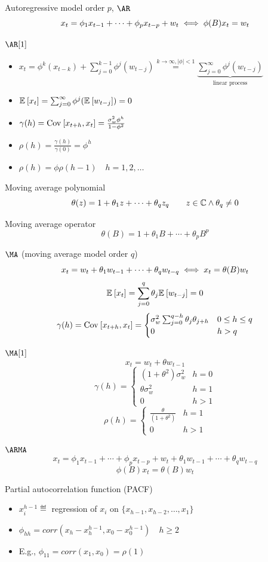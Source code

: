 \documentclass[landscape]{article}
\begin{document}
\begin{multicols*}{2}
Autoregressive model order $p$, $\AR$
$$x_t = \phi_1 x_{t-1} + \cdots + \phi_p x_{t-p} + w_t \;\Longleftrightarrow\; \phi(B)x_t = w_t$$

$\AR[1]$
\begin{itemize}
  \item $x_t = \phi^k(x_{t-k}) + \displaystyle\sum_{j=0}^{k-1} \phi^j(w_{t-j}) 
    \stackrel{k\to\infty, |\phi| < 1}{=} 
    \underbrace{\sum_{j=0}^\infty \phi^j(w_{t-j})}_{\text{linear process}}$
\item $\mathbb{E}_{}\left[x_t\right] = \sum_{j=0}^\infty\phi^j(\mathbb{E}_{}\left[w_{t-j}\right]) = 0$
\item $\gamma(h) = \mathrm{Cov}_{}\left[x_{t+h},x_t\right] = \frac{\sigma_w^2\phi^h}{1-\phi^2}$
\item $\rho(h) = \frac{\gamma(h)}{\gamma(0)} = \phi^h$
\item $\rho(h) = \phi \rho(h-1) \quad h=1,2,\ldots$
\end{itemize}

Moving average polynomial
$$\theta(z) = 1 + \theta_1 z + \cdots + \theta_q z_q 
\qquad z \in \mathbb{C} \wedge \theta_q \neq 0$$

Moving average operator
$$\theta(B) = 1 + \theta_1B + \cdots + \theta_pB^p$$

$\MA$ (moving average model order $q$)
$$x_t = w_t + \theta_1 w_{t-1} + \cdots + \theta_q w_{t-q} 
\;\Longleftrightarrow\; x_t = \theta(B)w_t$$
$$\mathbb{E}_{}\left[x_t\right] = \sum_{j=0}^q \theta_j\mathbb{E}_{}\left[w_{t-j}\right] = 0$$
$$\gamma(h) = \mathrm{Cov}_{}\left[x_{t+h},x_t\right] = \begin{cases}
  \sigma_w^2\sum_{j=0}^{q-h} \theta_j\theta_{j+h} & 0 \le h \le q \\
  0 & h > q
\end{cases}$$

$\MA[1]$
$$x_t = w_t + \theta w_{t-1}$$
$$\gamma(h) = \begin{cases}
  (1+\theta^2)\sigma_w^2 & h = 0 \\
  \theta\sigma_w^2 & h = 1 \\
  0 & h > 1
\end{cases}$$
$$\rho(h) = \begin{cases}
  \frac{\theta}{(1+\theta^2)} & h = 1 \\
  0 & h > 1
\end{cases}$$

$\ARMA$
$$x_t = \phi_1 x_{t-1} + \cdots + \phi_p x_{t-p} + w_t + \theta_1 w_{t-1} +
\cdots + \theta_q w_{t-q}$$
$$\phi(B) x_t = \theta(B) w_t$$

Partial autocorrelation function (PACF)
\begin{itemize}
  \item $x_i^{h-1} \eqdef$ regression of $x_i$ on 
    $\{x_{h-1}, x_{h-2}, \dots, x_1\}$
  \item $\phi_{hh} = corr(x_h - x_h^{h-1}, x_0 - x_0^{h-1}) \quad h \ge 2$
  \item E.g., $\phi_{11} = corr(x_1,x_0) = \rho(1)$
\end{itemize}


\end{multicols*}
\end{document}
